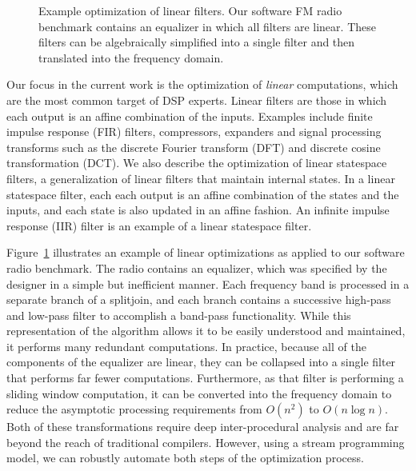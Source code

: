 \begin{figure}[t]
\caption[Example optimization of linear filters]{Example optimization
  of linear filters.  Our software FM radio benchmark contains an
  equalizer in which all filters are linear.  These filters can be
  algebraically simplified into a single filter and then translated
  into the frequency domain. \protect\label{fig:equalizer}}
\end{figure}

Our focus in the current work is the optimization of {\it linear}
computations, which are the most common target of DSP experts.  Linear
filters are those in which each output is an affine combination of the
inputs.  Examples include finite impulse response (FIR) filters,
compressors, expanders and signal processing transforms such as the
discrete Fourier transform (DFT) and discrete cosine transformation
(DCT).  We also describe the optimization of linear statespace
filters, a generalization of linear filters that maintain internal
states.  In a linear statespace filter, each each output is an affine
combination of the states and the inputs, and each state is also
updated in an affine fashion.  An infinite impulse response (IIR)
filter is an example of a linear statespace filter.

Figure~\ref{fig:equalizer} illustrates an example of linear
optimizations as applied to our software radio benchmark.  The radio
contains an equalizer, which was specified by the designer in a simple
but inefficient manner.  Each frequency band is processed in a
separate branch of a splitjoin, and each branch contains a successive
high-pass and low-pass filter to accomplish a band-pass functionality.
While this representation of the algorithm allows it to be easily
understood and maintained, it performs many redundant computations.  In
practice, because all of the components of the equalizer are linear,
they can be collapsed into a single filter that performs far fewer
computations.  Furthermore, as that filter is performing a sliding
window computation, it can be converted into the frequency domain to
reduce the asymptotic processing requirements from $O(n^2)$ to $O(n
\log n)$.  Both of these transformations require deep inter-procedural
analysis and are far beyond the reach of traditional compilers.
However, using a stream programming model, we can robustly automate
both steps of the optimization process.

